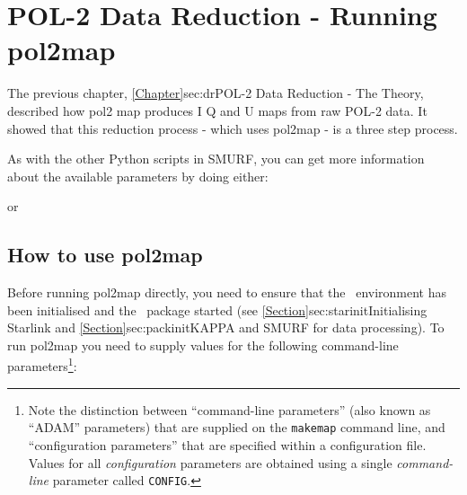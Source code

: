 \chapter{POL-2 Data Reduction - Running pol2map}
\label{sec:rundr}

The previous chapter, \cref{Chapter}{sec:dr}{POL-2 Data Reduction - The Theory}, described how pol2 map produces I Q and U maps from raw POL-2 data. 
It showed that this reduction process - which uses pol2map - is a three step process.  

As with the other Python scripts in SMURF, you can get more information about the available
parameters by doing either:
\begin{terminalv}
\end{terminalv}
or
\begin{terminalv}
\end{terminalv}

\section{How to use pol2map}

Before running pol2map directly, you need to ensure that the \starlink\ environment has been 
initialised and the \smurf\ package started (see
\cref{Section}{sec:starinit}{Initialising Starlink} and
\cref{Section}{sec:packinit}{KAPPA and SMURF for data processing}).
To run pol2map you need to supply values for the 
following command-line parameters\footnote{Note the distinction between
``command-line parameters'' (also known as ``ADAM'' parameters) that are
supplied on the \texttt{makemap} command line, and ``configuration parameters''
that are specified within a configuration file. Values for all
\emph{configuration} parameters are obtained using a single \emph{command-line}
parameter called \texttt{CONFIG}.}:



